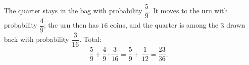The quarter stays in the bag with probability $\dfrac{5}{9}$. It moves to the urn with probability $\dfrac{4}{9}$; the urn then has $16$ coins, and the quarter is among the $3$ drawn back with probability $\dfrac{3}{16}$. Total:
\[\dfrac{5}{9}+\dfrac{4}{9}\cdot\dfrac{3}{16}=\dfrac{5}{9}+\dfrac{1}{12}=\boxed{\dfrac{23}{36}}.\]
